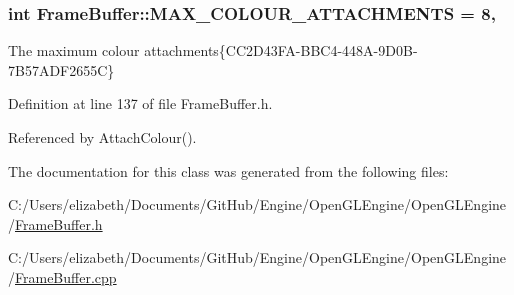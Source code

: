 \subsubsection[{\texorpdfstring{M\+A\+X\+\_\+\+C\+O\+L\+O\+U\+R\+\_\+\+A\+T\+T\+A\+C\+H\+M\+E\+N\+TS}{MAX_COLOUR_ATTACHMENTS}}]{\setlength{\rightskip}{0pt plus 5cm}int Frame\+Buffer\+::\+M\+A\+X\+\_\+\+C\+O\+L\+O\+U\+R\+\_\+\+A\+T\+T\+A\+C\+H\+M\+E\+N\+TS = 8\hspace{0.3cm}{\ttfamily [static]}, {\ttfamily [private]}}\hypertarget{class_frame_buffer_a2c1ad7bc95f26f6dee670a838ae863bc}{}\label{class_frame_buffer_a2c1ad7bc95f26f6dee670a838ae863bc}


The maximum colour attachments\{C\+C2\+D43\+F\+A-\/\+B\+B\+C4-\/448\+A-\/9\+D0\+B-\/7\+B57\+A\+D\+F2655C\} 



Definition at line 137 of file Frame\+Buffer.\+h.



Referenced by Attach\+Colour().



The documentation for this class was generated from the following files\+:\begin{DoxyCompactItemize}
\item 
C\+:/\+Users/elizabeth/\+Documents/\+Git\+Hub/\+Engine/\+Open\+G\+L\+Engine/\+Open\+G\+L\+Engine/\hyperlink{_frame_buffer_8h}{Frame\+Buffer.\+h}\item 
C\+:/\+Users/elizabeth/\+Documents/\+Git\+Hub/\+Engine/\+Open\+G\+L\+Engine/\+Open\+G\+L\+Engine/\hyperlink{_frame_buffer_8cpp}{Frame\+Buffer.\+cpp}\end{DoxyCompactItemize}
